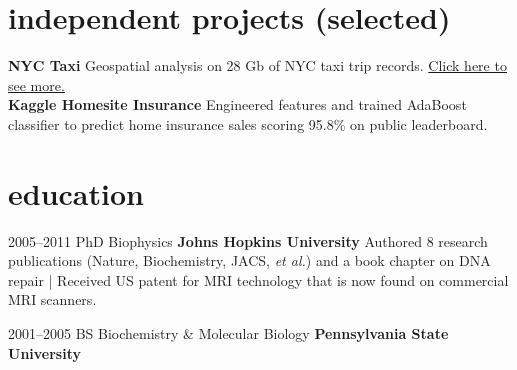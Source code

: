 \documentclass[]{friggeri-cv} %
\begin{document}
\section{independent projects (selected)}
\textbf {{NYC Taxi}} Geospatial analysis on 28 Gb of NYC taxi trip records.  \href{http://jfried23.github.io/webpage/}{Click here to see more.}\\
\textbf{{Kaggle Homesite Insurance}}  Engineered features and trained AdaBoost classifier to predict home insurance sales scoring 95.8\% on public leaderboard. \\


\section{education}

\begin{entrylist}


\entry
{2005--2011}
{PhD {\normalfont Biophysics}}
{\textbf{Johns Hopkins University}}
{Authored 8 research publications (Nature, Biochemistry, JACS, \textit{et al.}) and a book chapter on DNA repair | Received US patent for MRI technology that is now found on commercial MRI scanners.}


\entry
{2001--2005}
{BS {\normalfont Biochemistry \& Molecular Biology}}
{\textbf{Pennsylvania State University}}
{}


\end{entrylist}
\end{document}
